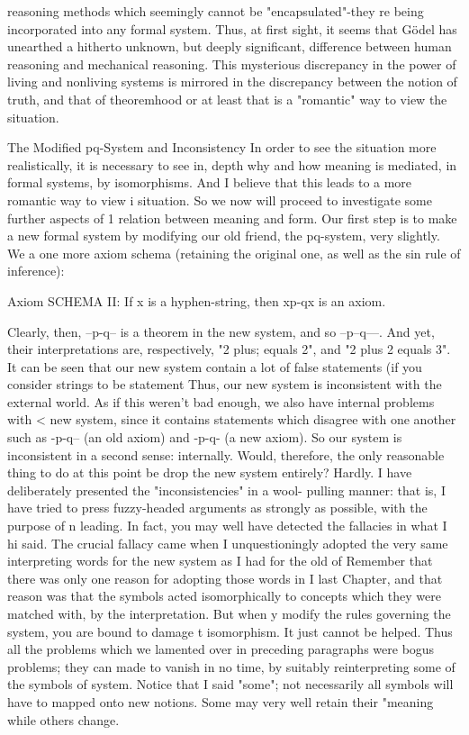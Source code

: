 reasoning methods which seemingly cannot be "encapsulated"-they re being incorporated into any formal system. Thus, at first sight, it seems that Gödel has unearthed a hitherto unknown, but deeply significant, difference between human reasoning and mechanical reasoning. This mysterious discrepancy in the power of living and nonliving systems is mirrored in the discrepancy between the notion of truth, and that of theoremhood or at least that is a "romantic" way to view the situation. 

The Modified pq-System and Inconsistency In order to see the situation more realistically, it is necessary to see in, depth why and how meaning is mediated, in formal systems, by isomorphisms. And I believe that this leads to a more romantic way to view i situation. So we now will proceed to investigate some further aspects of 1 relation between meaning and form. Our first step is to make a new formal system by modifying our old friend, the pq-system, very slightly. We a one more axiom schema (retaining the original one, as well as the sin rule of inference): 

Axiom SCHEMA II: If x is a hyphen-string, then xp-qx is an axiom. 

Clearly, then, --p-q-- is a theorem in the new system, and so --p--q---. And yet, their interpretations are, respectively, "2 plus; equals 2", and "2 plus 2 equals 3". It can be seen that our new system contain a lot of false statements (if you consider strings to be statement Thus, our new system is inconsistent with the external world. As if this weren't bad enough, we also have internal problems with < new system, since it contains statements which disagree with one another such as -p-q-- (an old axiom) and -p-q- (a new axiom). So our system is inconsistent in a second sense: internally. Would, therefore, the only reasonable thing to do at this point be drop the new system entirely? Hardly. I have deliberately presented the "inconsistencies" in a wool- pulling manner: that is, I have tried to press fuzzy-headed arguments as strongly as possible, with the purpose of n leading. In fact, you may well have detected the fallacies in what I hi said. The crucial fallacy came when I unquestioningly adopted the very same interpreting words for the new system as I had for the old of Remember that there was only one reason for adopting those words in I last Chapter, and that reason was that the symbols acted isomorphically to concepts which they were matched with, by the interpretation. But when y modify the rules governing the system, you are bound to damage t isomorphism. It just cannot be helped. Thus all the problems which we lamented over in preceding paragraphs were bogus problems; they can made to vanish in no time, by suitably reinterpreting some of the symbols of system. Notice that I said "some"; not necessarily all symbols will have to mapped onto new notions. Some may very well retain their "meaning while others change. 







